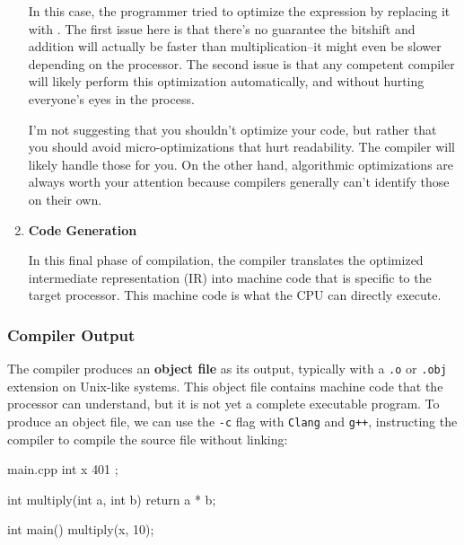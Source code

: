\documentclass[12pt]{article}
\begin{document}
\begin{enumerate}
\begin{advice}
\noindent
In this case, the programmer tried to optimize the expression  by replacing it with .
The first issue here is that there's no guarantee the bitshift and addition will actually be faster than multiplication--it might even be slower depending on the processor.
The second issue is that any competent compiler will likely perform this optimization automatically, and without hurting everyone's eyes in the process.

\vspace{1em}
\noindent
I'm not suggesting that you shouldn't optimize your code, but rather that you should avoid micro-optimizations that hurt readability.
The compiler will likely handle those for you.
On the other hand, algorithmic optimizations are always worth your attention because compilers generally can't identify those on their own.
\end{advice}

\item{\textbf{Code Generation}}

\noindent
In this final phase of compilation, the compiler translates the optimized intermediate representation (IR) into machine code that is specific to the target processor.
This machine code is what the CPU can directly execute.

\end{enumerate}

\subsubsection{Compiler Output}

\noindent
The compiler produces an \textbf{object file} as its output, typically with a \texttt{.o} or \texttt{.obj} extension on Unix-like systems.
This object file contains machine code that the processor can understand, but it is not yet a complete executable program.
To produce an object file, we can use the \texttt{-c} flag with \texttt{Clang} and \texttt{g++}, instructing the compiler to compile the source file without linking:

\begin{cxx}{main.cpp}
int x { 401 };

int multiply(int a, int b) { return a * b; }

int main() {
	multiply(x, 10);
}
\end{cxx}

\end{document}
